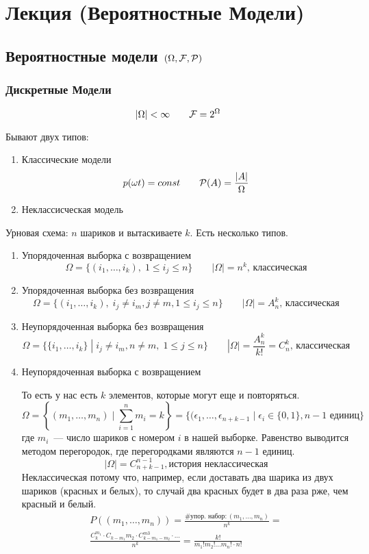\section{Лекция (Вероятностные Модели)}

\subsection{Вероятностные модели $(\Omega, \mathcal{F}, \mathcal{P})$}

\subsubsection{Дискретные Модели}
\[ |\Omega| < \infty \qquad \mathcal{F} = 2^\Omega\]

Бывают двух типов:
\begin{enumerate}
    \item Классические модели
        \[ p(\omega t) = const \qquad \mathcal{P} (A) = \frac{|A|}{\Omega} \]
    \item Неклассисческая модель
\end{enumerate}

Урновая схема: $n$ шариков и вытаскиваете $k$. Есть несколько типов.
\begin{enumerate}
\item Упорядоченная выборка с возвращением
    \[\Omega = \{(i_1, \ldots, i_k), \; 1 \leq i_j \leq n\} \qquad |\Omega| = n^k\text{, классическая}\]

\item Упорядоченная выборка без возвращения
    \[\Omega = \{(i_1, \ldots, i_k), \; i_j \neq i_m, j \neq m, 1 \leq i_j \leq n\} \qquad |\Omega| = A^k_n\text{, классическая}\]

\item Неупорядоченная выборка без возвращения
    \[ \Omega = \{ \{i_1, \ldots, i_k\} \;|\; i_j \neq i_m, n\neq m, \; 1\leq j \leq n\} \qquad |\Omega| = \frac{A_n^k}{k!}=C_n^k\text{, классическая} \]

\item Неупорядоченная выборка с возвращением

    То есть у нас есть $k$ элементов, которые могут еще и повторяться.
    \[ \Omega = \left\{ (m_1, \ldots, m_n) \;|\; \sum_{i=1}^nm_i=k\right\} = \{(\epsilon_1,\ldots, \epsilon_{n+k-1} \;|\; \epsilon_i \in \{0,1\}, n-1\text{ единиц}\} \]
где $m_i$~--- число шариков с номером  $i$ в нашей выборке. Равенство выводится методом перегородок, где перегородками являются $n-1$ единиц.
\[ |\Omega| =  C^{n-1}_{n+k-1}, \text{история неклассическая} \]
Неклассическая потому что, например, если доставать два шарика из двух шариков (красных и белых), то случай два красных будет в два раза рже, чем красный и белый.
\begin{gather*}
P((m_1, \ldots, m_n))  = \frac{\text{\#упор. набор}: (m_1,\ldots,m_n)}{n^k} =\\
\frac{C_k^{m_1}\cdot C_{k-m_1}{m_2} \cdot C_{k-m_1-m_2}^{m3}\cdot \ldots}{n^k} = 
\frac{k!}{m_1!m_2!\ldots m_n!\cdot n!} 
\end{gather*}

\end{enumerate}

